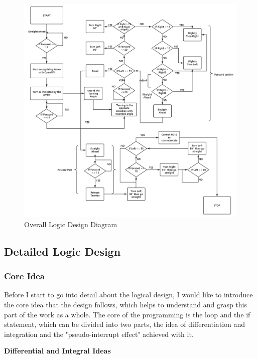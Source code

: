 \documentclass[12pt, a4paper, oneside]{report}
\begin{document}
\begin{figure}[H]
    \centering
    \includegraphics[scale=0.55]{pic/Patio 2/pa2-3.png} 
    \caption{Overall Logic Design Diagram}
    \label{pa2-3}
\end{figure}
\subsection{Detailed Logic Design}
\subsubsection{Core Idea}
Before I start to go into detail about the logical design, I would like to introduce the core idea that the design follows, which helps to understand and grasp this part of the work as a whole. The core of the programming is the loop and the if statement, which can be divided into two parts, the idea of differentiation and integration and the "pseudo-interrupt effect" achieved with it. 

\newpage
\textbf{Differential and Integral Ideas}
\vspace{0.4em}
\end{document}
